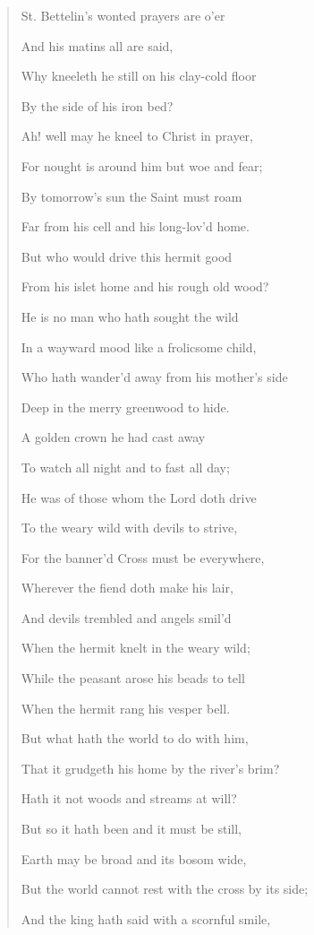 \begin{quote}

St. Bettelin's wonted prayers
are o'er

And his matins all are said,

Why kneeleth he still on his clay-cold floor

By the side of his iron bed?

Ah! well may he kneel to Christ in prayer,

For nought is around him but woe and fear;

By tomorrow's sun the Saint must roam

Far from his cell and his long-lov'd home.

But who would drive this hermit good

From his islet home and his rough old wood?

He is no man who hath sought the wild

In a wayward mood like a frolicsome child,

Who hath wander'd away from his mother's side

Deep in the merry greenwood to hide.

A golden crown he had cast away

To watch all night and to fast all day;

He was of those whom the Lord doth drive

To the weary wild with devils to strive,

For the banner'd Cross must be everywhere,

Wherever the fiend doth make his lair,

And devils trembled and angels smil'd

When the hermit knelt in the weary wild;

While the peasant arose his beads to tell

When the hermit rang his vesper bell.

But what hath the world to do with him,

That it grudgeth his home by the river's brim?

Hath it not woods and streams at will?

But so it hath been and it must be still, 

Earth may be broad and its bosom wide,

But the world cannot rest with the cross by its side;

And the king hath said with a scornful smile,


\end{quote}
